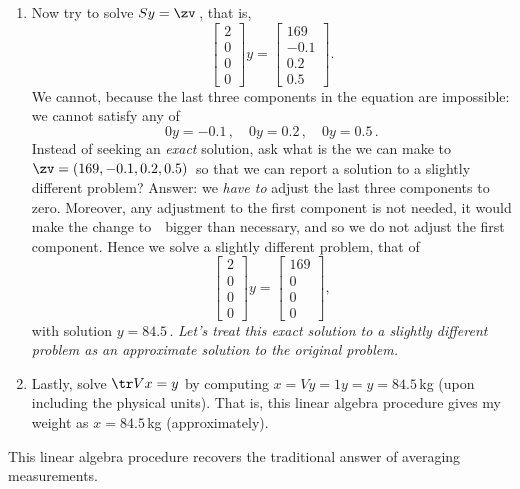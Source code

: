 \begin{example}
\begin{enumerate}
\item  Now try to solve \(Sy=\zv\)\,, that is,
\begin{equation*}
\begin{bmatrix} 2\\0\\0\\0 \end{bmatrix}y
=\begin{bmatrix} 169\\-0.1\\0.2\\0.5 \end{bmatrix}.
\end{equation*}
We cannot, because the last three components in the equation are impossible: we cannot satisfy any of
\begin{equation*}
0y=-0.1\,,\quad
0y=0.2\,,\quad
0y=0.5\,.
\end{equation*}
Instead of seeking an \emph{exact} solution, ask what is the \emph{} we can make to~\(\zv=(169,-0.1,0.2,0.5)\)\ so that we can report a solution to a slightly different problem?
Answer: we \emph{have to} adjust the last three components to zero. 
Moreover, any adjustment to the first component is not needed, it would make the change to~\zv\ bigger than necessary, and so we do not adjust the first component.
Hence we solve a slightly different problem, that of
\begin{equation*}
\begin{bmatrix} 2\\0\\0\\0 \end{bmatrix}y
=\begin{bmatrix} 169\\0\\0\\0 \end{bmatrix},
\end{equation*}
with solution \(y=84.5\)\,.
\emph{Let's treat this exact solution to a slightly different problem as an \emph{approximate} solution to the original problem.}

\item Lastly, solve \(\tr Vx=y\) by computing \(x=Vy=1y=y=84.5\)\,kg (upon including the physical units).
That is, this linear algebra procedure gives my weight as \(x=84.5\)\,kg (approximately).
\end{enumerate}
This linear algebra procedure recovers the traditional answer of averaging measurements.
\end{example}

